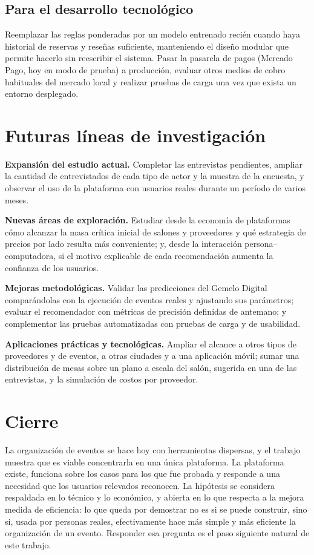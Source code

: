 \subsection{Para el desarrollo tecnológico}

Reemplazar las reglas ponderadas por un modelo entrenado recién cuando
haya historial de reservas y reseñas suficiente, manteniendo el diseño
modular que permite hacerlo sin reescribir el sistema. Pasar la
pasarela de pagos (Mercado Pago, hoy en modo de prueba) a producción,
evaluar otros medios de cobro habituales del mercado local y realizar
pruebas de carga una vez que exista un entorno desplegado.

\section{Futuras líneas de investigación}

\textbf{Expansión del estudio actual.} Completar las entrevistas
pendientes, ampliar la cantidad de entrevistados de cada tipo de actor y
la muestra de la encuesta, y observar el uso de la plataforma con
usuarios reales durante un período de varios meses.

\textbf{Nuevas áreas de exploración.} Estudiar desde la economía de
plataformas cómo alcanzar la masa crítica inicial de salones y proveedores
y qué estrategia de precios por lado resulta más conveniente; y, desde la
interacción persona--computadora, si el motivo explicable de cada
recomendación aumenta la confianza de los usuarios.

\textbf{Mejoras metodológicas.} Validar las predicciones del Gemelo
Digital comparándolas con la ejecución de eventos reales y ajustando sus
parámetros; evaluar el recomendador con métricas de precisión definidas de
antemano; y complementar las pruebas automatizadas con pruebas de carga y
de usabilidad.

\textbf{Aplicaciones prácticas y tecnológicas.} Ampliar el alcance a
otros tipos de proveedores y de eventos, a otras ciudades y a una
aplicación móvil; sumar una distribución de mesas sobre un plano a escala
del salón, sugerida en una de las entrevistas, y la simulación de costos
por proveedor.

\section{Cierre}

La organización de eventos se hace hoy con herramientas dispersas, y el
trabajo muestra que es viable concentrarla en una única plataforma. La
plataforma existe, funciona sobre los casos para los que fue probada y
responde a una necesidad que los usuarios relevados reconocen. La
hipótesis se considera respaldada en lo técnico y lo económico, y abierta
en lo que respecta a la mejora medida de eficiencia: lo que queda por
demostrar no es si se puede construir, sino si, usada por personas
reales, efectivamente hace más simple y más eficiente la organización de
un evento. Responder esa pregunta es el paso siguiente natural de este
trabajo.
